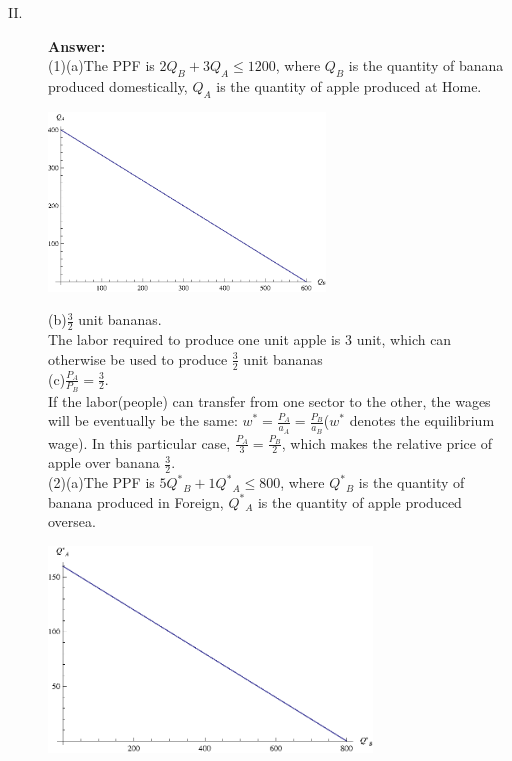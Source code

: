 \documentclass{article}
\begin{document}
\begin{description}
    \item[II.]{\bf Answer:}\\
        (1)(a)The PPF is $2Q_B+3Q_A\leq 1200$,
            where $Q_B$ is the quantity of banana produced domestically, $Q_A$ is the quantity of apple produced at Home.\\
            \begin{center}
               \includegraphics[angle=0, width=0.6\textwidth]{ECON3610A11}
            \end{center}
           (b)$\frac{3}{2}$ unit bananas.
           \\The labor required to produce one unit apple is 3 unit, which can otherwise be used to produce $\frac{3}{2}$ unit bananas\\
           (c)$\frac{P_A}{P_B}=\frac{3}{2}$.\\
           If the labor(people) can transfer from one sector to the other, the wages will be eventually be the same: $w^*=\frac{P_A}{a_A}=\frac{P_B}{a_B}$($w^*$ denotes the equilibrium wage). In this particular case, $\frac{P_A}{3}=\frac{P_B}{2}$, which makes the relative price of apple over banana $\frac{3}{2}$.  \\
        (2)(a)The PPF is $5Q^*{}_B+1Q^*{}_A\leq 800$,
            where $Q^*{}_B$ is the quantity of banana produced in Foreign, $Q^*{}_A$ is the quantity of apple produced oversea.\\
            \begin{center}
                \includegraphics[angle=0, width=0.7\textwidth]{ECON3610A12}

\end{center}
\end{description}
\end{document}
